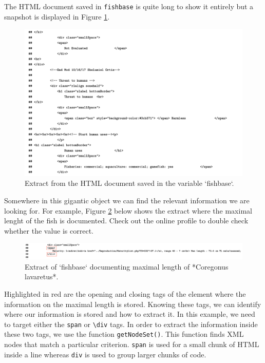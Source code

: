 \documentclass[
]{book}
\begin{document}
The HTML document saved in \texttt{fishbase} is quite long to show it entirely but a snapshot is displayed in Figure \ref{fig:fishbase}.

\begin{figure}
\includegraphics[width=21.14in]{./figures/fishbase} \caption{Extract from the HTML document saved in the variable `fishbase`.}\label{fig:fishbase}
\end{figure}

Somewhere in this gigantic object we can find the relevant information we are looking for. For example, Figure \ref{fig:maxle} below shows the extract where the maximal lenght of the fish is documented. Check out the online profile to double check whether the value is correct.

\begin{figure}
\includegraphics[width=18.75in]{./figures/fishbase_maxle} \caption{Extract of `fishbase` documenting maximal length of *Coregonus lavaretus*.}\label{fig:maxle}
\end{figure}

Highlighted in red are the opening and closing tags of the element where the information on the maximal length is stored. Knowing these tags, we can identify where our information is stored and how to extract it. In this example, we need to target either the \texttt{span} or \texttt{\textbackslash{}div} tags. In order to extract the information inside these two tags, we use the function \texttt{getNodeSet()}. This function finds XML nodes that match a particular criterion. \texttt{span} is used for a small chunk of HTML inside a line whereas \texttt{div} is used to group larger chunks of code.
\end{document}
